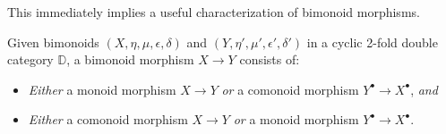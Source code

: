 This immediately implies a useful characterization of bimonoid morphisms.

\begin{corollary}\label{Cor:BimonMorphism}
	Given bimonoids $(X,\eta,\mu,\epsilon,\delta)$ and $(Y,\eta',\mu',\epsilon',\delta')$ in a cyclic 2-fold double category $\mathbb{D}$, a bimonoid morphism $X\to Y$ consists of:
	\begin{itemize}
		\item \emph{Either} a monoid morphism $X\to Y$ \emph{or} a comonoid morphism $Y^{\bullet}\to X^{\bullet}$, \emph{and}
		\item \emph{Either} a comonoid morphism $X\to Y$ \emph{or} a monoid morphism $Y^{\bullet}\to X^{\bullet}$.
	\end{itemize}
\end{corollary}